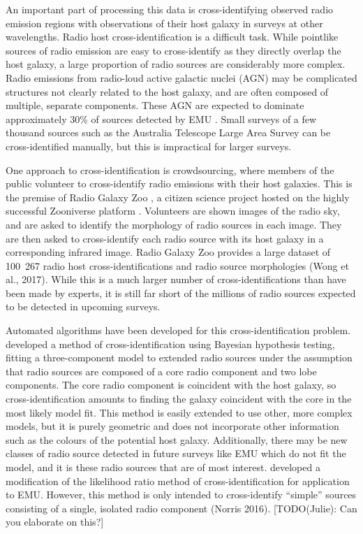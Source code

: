 \documentclass[fleqn,usenatbib,usedcolumn]{mnras}
\begin{document}
  An important part of processing this data is cross-identifying observed
  radio emission regions with observations of their host galaxy in surveys at
  other wavelengths. Radio host cross-identification is a difficult task.
  While pointlike sources of radio emission are easy to cross-identify as they
  directly overlap the host galaxy, a large proportion of radio sources are
  considerably more complex. Radio emissions from radio-loud active galactic
  nuclei (AGN) may be complicated structures not clearly related to the host
  galaxy, and are often composed of multiple, separate components. These AGN
  are expected to dominate approximately 30\% of sources detected by EMU
  \citep{norris11}. Small surveys of a few thousand sources such as the
  Australia Telescope Large Area Survey
  \citep[ATLAS;][]{norris06,middelberg08} can be cross-identified manually,
  but this is impractical for larger surveys.

  One approach to cross-identification is crowdsourcing, where members of the
  public volunteer to cross-identify radio emissions with their host galaxies.
  This is the premise of Radio Galaxy Zoo \citep[RGZ;][]{banfield15}, a
  citizen science project hosted on the highly successful Zooniverse platform
  \citep{lintott08}. Volunteers are shown images of the radio sky, and are
  asked to identify the morphology of radio sources in each image. They are
  then asked to cross-identify each radio source with its host galaxy in a
  corresponding infrared image. Radio Galaxy Zoo provides a large dataset of
  100~267 radio host cross-identifications and radio source morphologies (Wong
  et al., 2017). While this is a much larger number of cross-identifications
  than have been made by experts, it is still far short of the millions of
  radio sources expected to be detected in upcoming surveys.

  Automated algorithms have been developed for this cross-identification
  problem. \citet{fan15} developed a method of cross-identification using
  Bayesian hypothesis testing, fitting a three-component model to extended
  radio sources under the assumption that radio sources are composed of a core
  radio component and two lobe components. The core radio component is
  coincident with the host galaxy, so cross-identification amounts to finding
  the galaxy coincident with the core in the most likely model fit. This
  method is easily extended to use other, more complex models, but it is
  purely geometric and does not incorporate other information such as the
  colours of the potential host galaxy. Additionally, there may be new classes
  of radio source detected in future surveys like EMU which do not fit the
  model, and it is these radio sources that are of most interest.
  \citet{weston17} developed a modification of the likelihood ratio method of
  cross-identification \citep{richter75} for application to EMU. However, this
  method is only intended to cross-identify ``simple'' sources consisting of a
  single, isolated radio component (Norris 2016). {[}TODO(Julie): Can you
  elaborate on this?{]}
\end{document}
